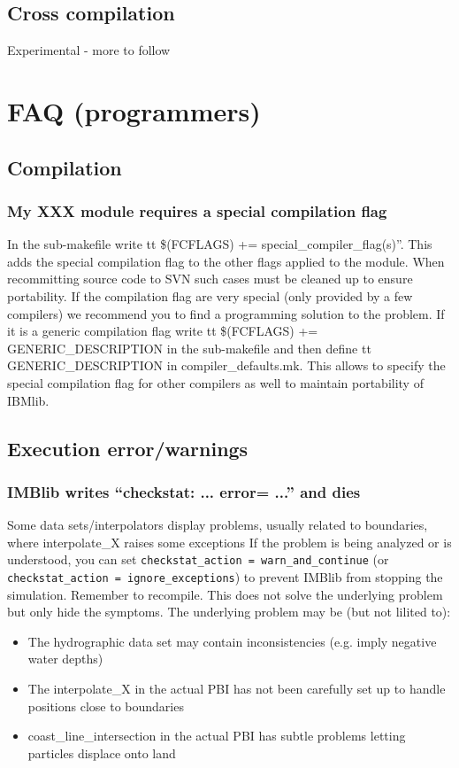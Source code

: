 \section{Cross compilation}
Experimental - more to follow

\chapter{FAQ (programmers)}

\section{Compilation}
   \subsection{My XXX module requires a special compilation flag}
   In the sub-makefile write {tt \$(FCFLAGS) += special\_compiler\_flag(s)}''.
   This adds the special compilation flag to the other flags applied
   to the module. 
   When recommitting source code to SVN such cases must be cleaned up to 
   ensure portability. If the compilation flag are very special (only provided by
   a few compilers) we recommend you to find a programming solution
   to the problem. If it is a generic compilation flag write 
   {tt \$(FCFLAGS) += GENERIC\_DESCRIPTION} in the sub-makefile and then
   define {tt GENERIC\_DESCRIPTION} in compiler\_defaults.mk. 
   This allows to specify the special compilation flag for other compilers
   as well to maintain portability of IBMlib.

\section{Execution error/warnings}
   \subsection{IMBlib writes ``checkstat: ... error= ...'' and dies}
   Some data sets/interpolators display problems, usually related to 
   boundaries, where interpolate\_X raises some exceptions
   If the problem is being analyzed or is understood, you 
   can set {\tt checkstat\_action = warn\_and\_continue} 
   (or {\tt checkstat\_action = ignore\_exceptions}) to prevent 
   IMBlib from stopping the simulation. Remember to recompile.
   This does not solve the underlying problem but only hide the symptoms. 
   The underlying problem may be (but not lilited to):
   \begin{itemize}
     \item  The hydrographic data set may contain inconsistencies
            (e.g. imply negative water depths)
     \item  The interpolate\_X in the actual PBI has not been carefully set up to 
            handle positions close to boundaries
     \item  coast\_line\_intersection in the actual PBI has subtle problems
            letting particles displace onto land
   \end{itemize}
   

